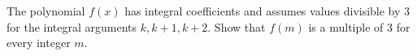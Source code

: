 The polynomial $f(x)$ has integral coefficients and assumes values divisible by $3$ for the integral arguments $k, k + 1, k + 2$. Show that $f(m)$ is a multiple of $3$ for every integer $m$.
